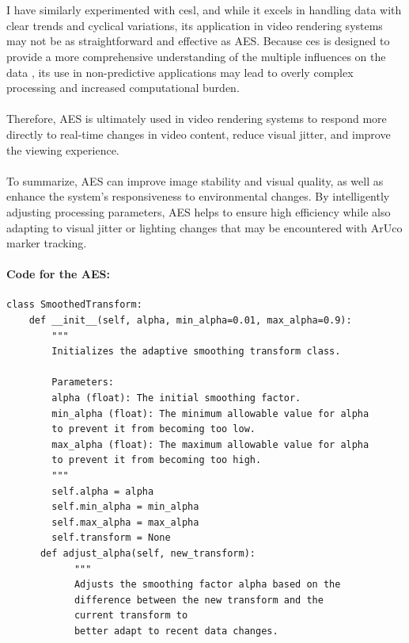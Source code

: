 \documentclass[12pt]{article}
\begin{document}
\begin{enumerate}
\begin{enumerate}
                        \\\\
                        I have similarly experimented with \gls{cesl}, and while it excels in handling data with clear trends and cyclical variations, its application in video rendering systems may not be as straightforward and effective as AES. Because \gls{ces} is designed to provide a more comprehensive understanding of the multiple influences on the data \cite{ComplexES2018,Complex}, its use in non-predictive applications may lead to overly complex processing and increased computational burden.
                        \\\\
                        Therefore, AES is ultimately used in video rendering systems to respond more directly to real-time changes in video content, reduce visual jitter, and improve the viewing experience.
                        \\\\
                        To summarize, AES can improve image stability and visual quality, as well as enhance the system's responsiveness to environmental changes. By intelligently adjusting processing parameters, AES helps to ensure high efficiency while also adapting to visual jitter or lighting changes that may be encountered with ArUco marker tracking.
                        \paragraph{Code for the AES:}
                        \begin{verbatim}
class SmoothedTransform:
    def __init__(self, alpha, min_alpha=0.01, max_alpha=0.9):
        """
        Initializes the adaptive smoothing transform class.
        
        Parameters:
        alpha (float): The initial smoothing factor.
        min_alpha (float): The minimum allowable value for alpha 
        to prevent it from becoming too low.
        max_alpha (float): The maximum allowable value for alpha 
        to prevent it from becoming too high.
        """
        self.alpha = alpha
        self.min_alpha = min_alpha
        self.max_alpha = max_alpha
        self.transform = None
      def adjust_alpha(self, new_transform):
            """
            Adjusts the smoothing factor alpha based on the 
            difference between the new transform and the 
            current transform to 
            better adapt to recent data changes.
                                          

\end{verbatim}
\end{enumerate}
\end{enumerate}
\end{document}
